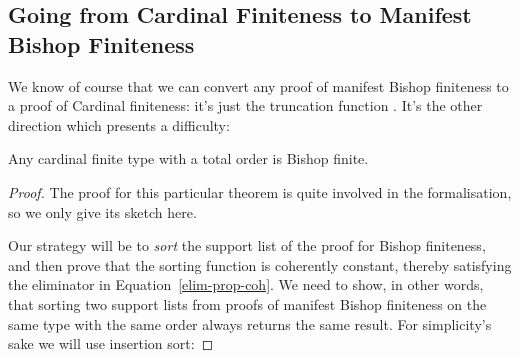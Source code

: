 \subsection{Going from Cardinal Finiteness to Manifest Bishop Finiteness}
We know of course that we can convert any proof of manifest Bishop finiteness to
a proof of Cardinal finiteness: it's just the truncation function
\AgdaInductiveConstructor{\(\lvert \_ \rvert\)}.
It's the other direction which presents a difficulty:
\begin{theorem} \label{cardinal-to-manifest-bishop}
  Any cardinal finite type with a total order is Bishop finite.
\end{theorem}
\begin{proof}
The proof for this particular theorem is quite involved in the formalisation, so
we only give its sketch here.

Our strategy will be to \emph{sort} the support list of the proof for Bishop
finiteness, and then prove that the sorting function is coherently constant,
thereby satisfying the eliminator in Equation~\ref{elim-prop-coh}.
We need to show, in other words, that sorting two support lists from proofs of
manifest Bishop finiteness on the same type with the same order always returns
the same result.
For simplicity's sake we will use insertion sort:


\end{proof}

